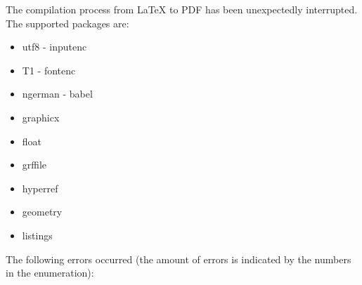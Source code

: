 The compilation process from \LaTeX{} to PDF has been unexpectedly interrupted.
The supported packages are:
\begin{itemize}
\item utf8 - inputenc
\item T1 - fontenc
\item ngerman - babel
\item graphicx
\item float
\item grffile
\item hyperref
\item geometry
\item listings
\end{itemize}

The following errors occurred (the amount of errors is indicated by the numbers in the enumeration):

